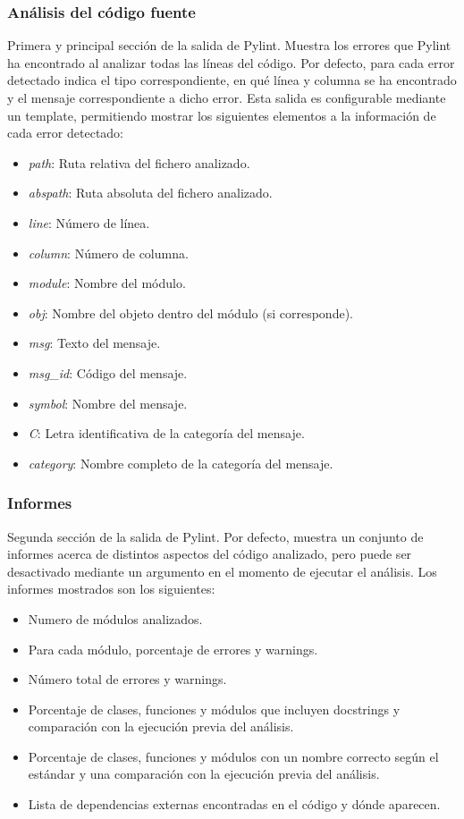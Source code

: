 \documentclass[a4paper, 12pt]{book}
\begin{document}
\subsubsection{Análisis del código fuente}

Primera y principal sección de la salida de Pylint. Muestra los errores que Pylint ha encontrado al analizar todas las líneas del código.
Por defecto, para cada error detectado indica el tipo correspondiente, en qué línea y columna se ha encontrado y el mensaje correspondiente a dicho error.
Esta salida es configurable mediante un template, permitiendo mostrar los siguientes elementos a la información de cada error detectado:
\begin{itemize}
	\item \textit{path}: Ruta relativa del fichero analizado.
	\item \textit{abspath}: Ruta absoluta del fichero analizado.
	\item \textit{line}: Número de línea.
	\item \textit{column}: Número de columna.
	\item \textit{module}: Nombre del módulo.
	\item \textit{obj}: Nombre del objeto dentro del módulo (si corresponde).
	\item \textit{msg}: Texto del mensaje.
	\item \textit{msg\_id}: Código del mensaje.
	\item \textit{symbol}: Nombre del mensaje.
	\item \textit{C}: Letra identificativa de la categoría del mensaje.
	\item \textit{category}: Nombre completo de la categoría del mensaje.
\end{itemize} 

\subsubsection{Informes}

Segunda sección de la salida de Pylint. 
Por defecto, muestra un conjunto de informes acerca de distintos aspectos del código analizado, pero puede ser desactivado mediante un argumento en el momento de ejecutar el análisis.
Los informes mostrados son los siguientes:
\begin{itemize}
	\item Numero de módulos analizados.
	\item Para cada módulo, porcentaje de errores y warnings.
	\item Número total de errores y warnings.
	\item Porcentaje de clases, funciones y módulos que incluyen docstrings y comparación con la ejecución previa del análisis.
	\item Porcentaje de clases, funciones y módulos con un nombre correcto según el estándar y una comparación con la ejecución previa del análisis.
	\item Lista de dependencias externas encontradas en el código y dónde aparecen.
\end{itemize}
\end{document}
